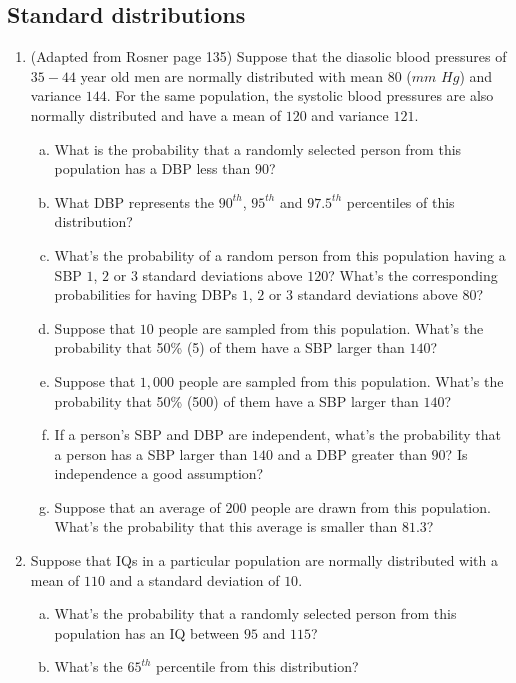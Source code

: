 \documentclass[12pt]{article}
\begin{document}
\begin{enumerate}[1.]
\section{Standard distributions}
\begin{enumerate}[1.]
\item (Adapted from Rosner page 135) Suppose that the diasolic blood
  pressures of $35-44$ year old men are normally distributed with mean
  $80$ ($mm$ $Hg$) and variance $144$. For the same population, the
  systolic blood pressures are also normally distributed and have a
  mean of $120$ and variance $121$.
  \begin{enumerate}[a.]
  \item What is the probability that a randomly selected person from
    this population has a DBP less than 90?
  \item What DBP represents the $90^{th}$, $95^{th}$ and $97.5^{th}$
    percentiles of this distribution?
  \item What's the probability of a random person from this population
    having a SBP $1$, $2$ or $3$ standard deviations above $120$? 
    What's the corresponding probabilities for having DBPs $1$, $2$ or
    $3$ standard deviations above $80$?
  \item Suppose that $10$ people are sampled from this population.  What's
    the probability that 50\% (5) of them have a SBP larger than $140$?
  \item Suppose that $1,000$ people are sampled from this population.  What's
    the probability that 50\% (500) of them have a SBP larger than $140$?
  \item If a person's SBP and DBP are independent, what's the
    probability that a person has a SBP larger than $140$ and a DBP
    greater than $90$? Is independence a good assumption?
  \item Suppose that an average of $200$ people are drawn from 
    this population. What's the probability that this average
    is smaller than $81.3$?
  \end{enumerate}  
\item  Suppose that IQs in a particular population are normally
  distributed with a mean of $110$ and a standard deviation of $10$.
  \begin{enumerate}[a.]
  \item What's the probability that a randomly selected person from
    this population has an IQ between $95$ and $115$?
  \item What's the $65^{th}$ percentile from this distribution?

\end{enumerate}
\end{enumerate}
\end{enumerate}
\end{document}
